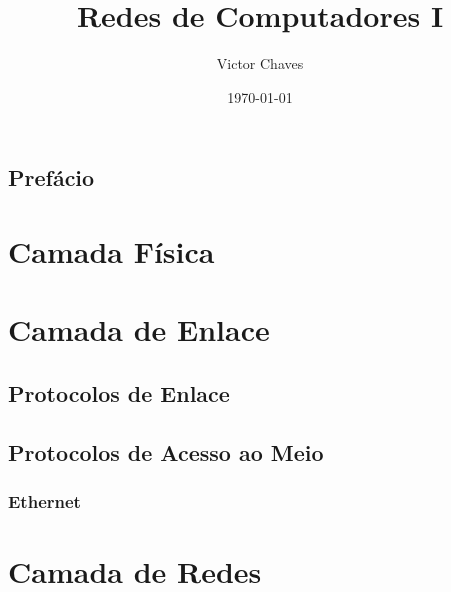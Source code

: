 \documentclass{imetex}
\author{Victor Chaves}
\title{Redes de Computadores I}
\date{\today}
\begin{document}
 
\printFrontMatter

\chapter*{Prefácio}

\part{Camada Física}

\part{Camada de Enlace}
\chapter{Protocolos de Enlace}
\chapter{Protocolos de Acesso ao Meio}
\section{Ethernet}

\part{Camada de Redes}

\printBackMatter
\end{document}
